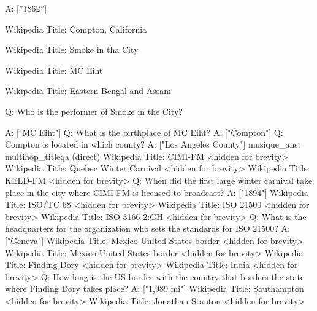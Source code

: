 \documentclass[
]{article}
\newenvironment{Shaded}{}{}
\newcommand{\NormalTok}[1]{#1}
\begin{document}
A: {[}''1862''{]}

Wikipedia Title: Compton, California

Wikipedia Title: Smoke in tha City

Wikipedia Title: MC Eiht

Wikipedia Title: Eastern Bengal and Assam

Q: Who is the performer of Smoke in the City?

\begin{Shaded}
\begin{Highlighting}[]
\NormalTok{A: ["MC Eiht"]}
\NormalTok{Q: What is the birthplace of MC Eiht?}
\NormalTok{A: ["Compton"]}
\NormalTok{Q: Compton is located in which county?}
\NormalTok{A: ["Los Angeles County"]}
\NormalTok{musique\_ans: multihop\_titleqa (direct)}
\NormalTok{Wikipedia Title: CIMI{-}FM}
\NormalTok{\textless{}hidden for brevity\textgreater{}}
\NormalTok{Wikipedia Title: Quebec Winter Carnival}
\NormalTok{\textless{}hidden for brevity\textgreater{}}
\NormalTok{Wikipedia Title: KELD{-}FM}
\NormalTok{\textless{}hidden for brevity\textgreater{}}
\NormalTok{Q: When did the first large winter carnival take place in the city where CIMI{-}FM is licensed to broadcast?}
\NormalTok{A: ["1894"]}
\NormalTok{Wikipedia Title: ISO/TC 68}
\NormalTok{\textless{}hidden for brevity\textgreater{}}
\NormalTok{Wikipedia Title: ISO 21500}
\NormalTok{\textless{}hidden for brevity\textgreater{}}
\NormalTok{Wikipedia Title: ISO 3166{-}2:GH}
\NormalTok{\textless{}hidden for brevity\textgreater{}}
\NormalTok{Q: What is the headquarters for the organization who sets the standards for ISO 21500?}
\NormalTok{A: ["Geneva"]}
\NormalTok{Wikipedia Title: Mexico{-}United States border}
\NormalTok{\textless{}hidden for brevity\textgreater{}}
\NormalTok{Wikipedia Title: Mexico{-}United States border}
\NormalTok{\textless{}hidden for brevity\textgreater{}}
\NormalTok{Wikipedia Title: Finding Dory}
\NormalTok{\textless{}hidden for brevity\textgreater{}}
\NormalTok{Wikipedia Title: India}
\NormalTok{\textless{}hidden for brevity\textgreater{}}
\NormalTok{Q: How long is the US border with the country that borders the state where Finding Dory takes place?}
\NormalTok{A: ["1,989 mi"]}
\NormalTok{Wikipedia Title: Southampton}
\NormalTok{\textless{}hidden for brevity\textgreater{}}
\NormalTok{Wikipedia Title: Jonathan Stanton}
\NormalTok{\textless{}hidden for brevity\textgreater{} }
\end{Highlighting}
\end{Shaded}
\end{document}
